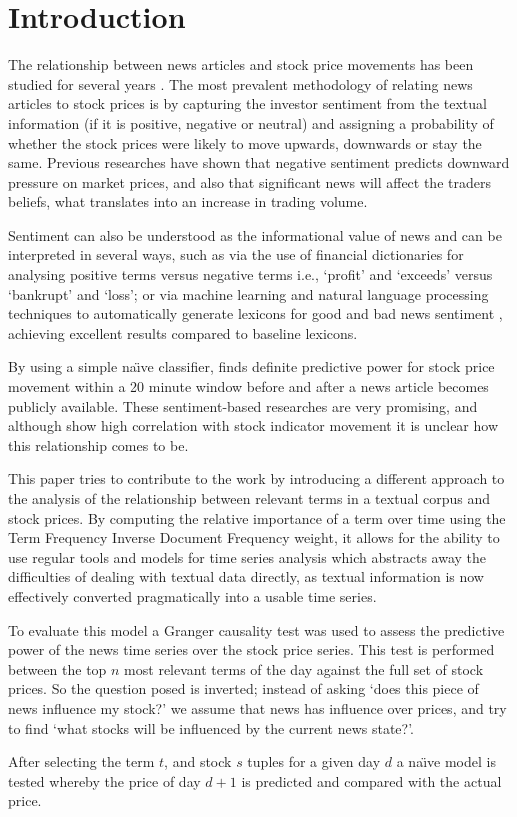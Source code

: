 \documentclass{article}
\begin{document}
\section{Introduction}
The relationship between news articles and stock price movements has been studied for several years \citep{gidofalvi2001,Fu2008}. The most prevalent methodology of relating news articles to stock prices is by capturing the investor sentiment \citep{Handbook} from the textual information (if it is positive, negative or neutral) and assigning a probability of whether the stock prices were likely to move upwards, downwards or stay the same. Previous researches \citep{Tetlock2007} have shown that negative sentiment predicts downward pressure on market prices, and also \citep{barber2008all} that significant news will affect the traders beliefs, what translates into an increase in trading volume.
\par
Sentiment can also be understood as the informational value of news and can be interpreted in several ways, such as via the use of financial dictionaries for analysing positive terms versus negative terms 
i.e., `profit' and `exceeds' versus `bankrupt' and `loss'; or via machine learning and natural language processing techniques to automatically generate lexicons for good and bad news sentiment \citep{Oliveira2014}, achieving excellent results compared to baseline lexicons.
\par
By using a simple na\"{\i}ve classifier, \citep{gidofalvi2001} finds definite predictive power for stock price movement within a 20 minute window before and after a news article becomes publicly available. These sentiment-based researches are very promising, and although show high correlation with stock indicator movement it is unclear how this relationship comes to be.
\par
This paper tries to contribute to the work by introducing a different approach to the analysis of the relationship between relevant terms in a textual corpus and stock prices. By computing the relative importance of a term over time using the Term Frequency Inverse Document Frequency \citep{Ramos2003} weight, it allows for the ability to use regular tools and models for time series analysis which abstracts away the difficulties of dealing with textual data directly, as textual information is now effectively converted pragmatically into a usable time series.
\par
To evaluate this model a Granger causality test \citep{Granger1969,Granger1980} was used to assess the predictive power of the news time series over the stock price series. This test is performed between the top \(n\) most relevant terms of the day against the full set of stock prices. So the question posed is inverted; instead of asking `does this piece of news influence my stock?' we assume that news has influence over prices, and try to find `what stocks will be influenced by the current news state?'.
\par
After selecting the term \(t\), and stock \(s\) tuples for a given day \(d\) a na\"{\i}ve model is tested whereby the price of day \(d+1\) is predicted and compared with the actual price.
\end{document}
